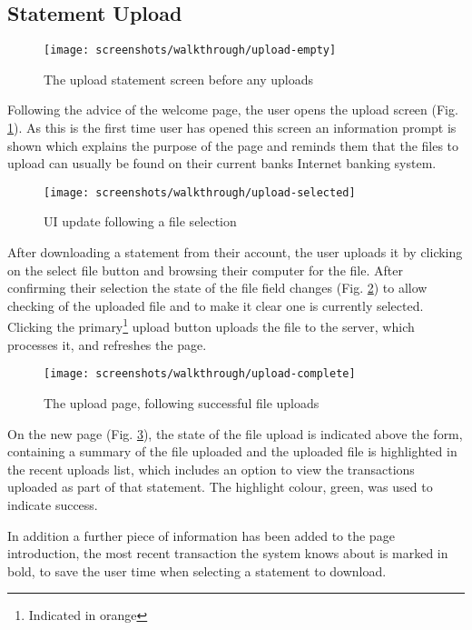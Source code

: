 \subsection{Statement Upload}

\begin{figure}
\centering
\texttt{[image: screenshots/walkthrough/upload-empty]}
\caption{The upload statement screen before any uploads}
\label{fig:uploadempty}
\end{figure}

Following the advice of the welcome page, the user opens the upload screen (Fig. \ref{fig:uploadempty}). As this is the first time user has opened this screen an information prompt is shown which explains the purpose of the page and reminds them that the files to upload can usually be found on their current banks Internet banking system.

\begin{figure}
\centering
\texttt{[image: screenshots/walkthrough/upload-selected]}
\caption{UI update following a file selection}
\label{fig:upload-selected}
\end{figure}

After downloading a statement from their account, the user uploads it by clicking on the select file button and browsing their computer for the file. After confirming their selection the state of the file field changes (Fig. \ref{fig:upload-selected}) to allow checking of the uploaded file and to make it clear one is currently selected. Clicking the primary\footnote{Indicated in orange} upload button uploads the file to the server, which processes it, and refreshes the page.

\begin{figure}
\centering
\texttt{[image: screenshots/walkthrough/upload-complete]}
\caption{The upload page, following successful file uploads}
\label{fig:upload-complete}
\end{figure}

On the new page (Fig. \ref{fig:upload-complete}), the state of the file upload is indicated above the form, containing a summary of the file uploaded and the uploaded file is highlighted in the recent uploads list, which includes an option to view the transactions uploaded as part of that statement. The highlight colour, green, was used to indicate success. 

In addition a further piece of information has been added to the page introduction, the most recent transaction the system knows about is marked in bold, to save the user time when selecting a statement to download.

